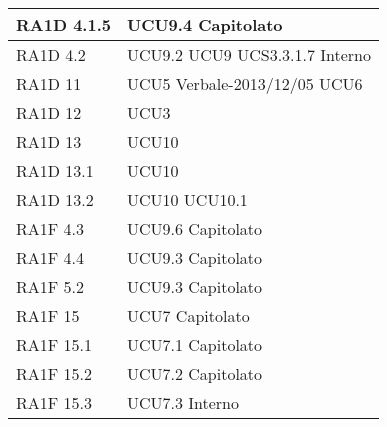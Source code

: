 \begin{center}
\begin{longtable}{ | p{5cm} | p{5cm} |}
        RA1D 4.1.5 &  UCU9.4 \newline  Capitolato \newline  \\ \hline      
        RA1D 4.2  &  UCU9.2 \newline  UCU9 \newline  UCS3.3.1.7 \newline  Interno \newline  \\ \hline      
        RA1D 11 &  UCU5 \newline  Verbale-2013/12/05 \newline  UCU6 \newline  \\ \hline      
        RA1D 12 &  UCU3 \newline  \\ \hline      
        RA1D 13 &  UCU10 \newline  \\ \hline      
        RA1D 13.1 &  UCU10 \newline  \\ \hline      
        RA1D 13.2 &  UCU10 \newline  UCU10.1 \newline  \\ \hline      
        RA1F 4.3 &  UCU9.6 \newline  Capitolato \newline  \\ \hline      
        RA1F 4.4 &  UCU9.3 \newline  Capitolato \newline  \\ \hline      
        RA1F 5.2 &  UCU9.3 \newline  Capitolato \newline  \\ \hline      
        RA1F 15 &  UCU7 \newline  Capitolato \newline  \\ \hline      
        RA1F 15.1 &  UCU7.1 \newline  Capitolato \newline  \\ \hline      
        RA1F 15.2 &  UCU7.2 \newline  Capitolato \newline  \\ \hline      
        RA1F 15.3 &  UCU7.3 \newline  Interno \newline  \\ \hline      

\end{longtable}
\end{center}
